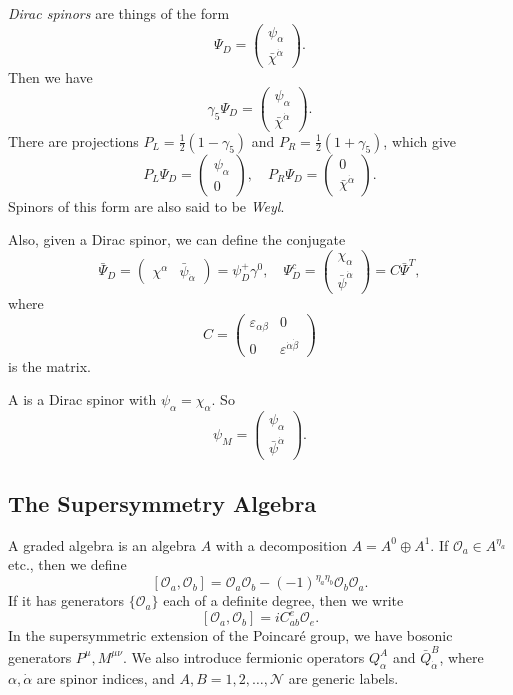 \documentclass[a4paper]{article}
\begin{document}
\emph{Dirac spinors} are things of the form
\[
  \Psi_D = \begin{pmatrix}\psi_\alpha\\\bar{\chi}^{\dot{\alpha}}\end{pmatrix}.
\]
Then we have
\[
  \gamma_5 \Psi_D = \begin{pmatrix}\psi_\alpha\\\bar{\chi}^{\dot{\alpha}}\end{pmatrix}.
\]
There are projections $P_L = \frac{1}{2} (1 - \gamma_5)$ and $P_R = \frac{1}{2}(1 + \gamma_5)$, which give
\[
  P_L \Psi_D = \begin{pmatrix}\psi_\alpha\\ 0\end{pmatrix},\quad 
  P_R \Psi_D = \begin{pmatrix}0\\\bar{\chi}^{\dot{\alpha}}\end{pmatrix}.
\]
Spinors of this form are also said to be \emph{Weyl}.

Also, given a Dirac spinor, we can define the conjugate
\[
  \bar{\Psi}_D =
  \begin{pmatrix}
    \chi^\alpha & \bar{\psi}_{\dot{\alpha}}
  \end{pmatrix} = \psi_D^+ \gamma^0,\quad \Psi_D^c =
  \begin{pmatrix}
    \chi_\alpha \\ \bar{\psi}^{\dot{\alpha}}
  \end{pmatrix} = C \bar{\Psi}^T,
\]
where
\[
  C =
  \begin{pmatrix}
    \varepsilon_{\alpha\beta} & 0\\
    0 & \varepsilon^{\dot{\alpha} \dot{\beta}}
  \end{pmatrix}
\]
is the  matrix.

A  is a Dirac spinor with $\psi_\alpha = \chi_\alpha$. So
\[
  \psi_M =
  \begin{pmatrix}
    \psi_\alpha\\ \bar{\psi}^{\dot{\alpha}}
  \end{pmatrix}.
\]
\subsection{The Supersymmetry Algebra}
A graded algebra is an algebra $A$ with a decomposition $A = A^0 \oplus A^1$. If $\mathcal{O}_a \in A^{\eta_a}$ etc., then we define %
\[
  [\mathcal{O}_a, \mathcal{O}_b] = \mathcal{O}_a \mathcal{O}_b - (-1)^{\eta_a \eta_b} \mathcal{O}_b \mathcal{O}_a. %
\]
If it has generators $\{\mathcal{O}_a\}$ each of a definite degree, then we write
\[
  [\mathcal{O}_a, \mathcal{O}_b] = i C^e_{ab} \mathcal{O}_e.
\]
In the supersymmetric extension of the Poincar\'e group, we have bosonic generators $P^\mu, M^{\mu\nu}$. We also introduce fermionic operators $Q_\alpha^A$ and $\bar{Q}_{\dot{\alpha}}^B$, where $\alpha, \dot{\alpha}$ are spinor indices, and $A, B = 1, 2, \ldots, \mathcal{N}$ are generic labels.
\end{document}
